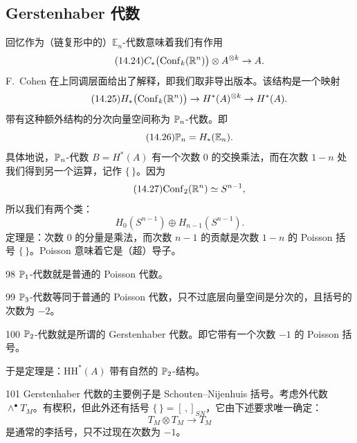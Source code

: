 \subsection{Gerstenhaber 代数}\label{sec:14-2-1}

回忆作为（链复形中的）$\mathbb{E}_n$-代数意味着我们有作用
\begin{equation}\tag{14.24}
C_*\bigl(\mathrm{Conf}_k(\mathbb{R}^n)\bigr)\otimes A^{\otimes k}\to A.
\end{equation}
F.~Cohen 在上同调层面给出了解释，即我们取非导出版本。该结构是一个映射
\begin{equation}\tag{14.25}
H_*\bigl(\mathrm{Conf}_k(\mathbb{R}^n)\bigr)\to H^*(A)^{\otimes k}\to H^*(A).
\end{equation}
带有这种额外结构的分次向量空间称为 $\mathbb{P}_n$-代数。即
\begin{equation}\tag{14.26}
\mathbb{P}_n=H_*(\mathbb{E}_n).
\end{equation}
具体地说，$\mathbb{P}_n$-代数 $B=H^*(A)$ 有一个次数 0 的交换乘法，而在次数 $1-n$ 处我们得到另一个运算，记作 $\{\,\}$。因为
\begin{equation}\tag{14.27}
\mathrm{Conf}_2(\mathbb{R}^n)\simeq S^{n-1},
\end{equation}
所以我们有两个类：
\begin{equation}\tag{14.28}
H_0(S^{n-1})\oplus H_{n-1}(S^{n-1}).
\end{equation}
定理是：次数 0 的分量是乘法，而次数 $n-1$ 的贡献是次数 $1-n$ 的 Poisson 括号 $\{\,\}$。Poisson 意味着它是（超）导子。

\begin{srcex}{98}
$\mathbb{P}_1$-代数就是普通的 Poisson 代数。
\end{srcex}

\begin{srcex}{99}
$\mathbb{P}_3$-代数等同于普通的 Poisson 代数，只不过底层向量空间是分次的，且括号的次数为 $-2$。
\end{srcex}

\begin{srcex}{100}
$\mathbb{P}_2$-代数就是所谓的 Gerstenhaber 代数。即它带有一个次数 $-1$ 的 Poisson 括号。
\end{srcex}

于是定理是：$\mathrm{HH}^*(A)$ 带有自然的 $\mathbb{P}_2$-结构。

\begin{srcex}{101}
Gerstenhaber 代数的主要例子是 Schouten–Nijenhuis 括号。考虑外代数 $\wedge^\bullet T_M$。有楔积，但此外还有括号 $\{\,\}=[\,,]_{SN}$，它由下述要求唯一确定：
\begin{equation}\tag{14.29}
T_M\otimes T_M\to T_M
\end{equation}
是通常的李括号，只不过现在次数为 $-1$。
\end{srcex}

